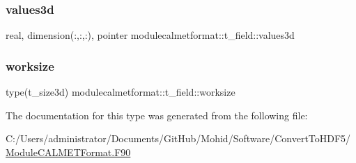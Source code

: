 \mbox{\label{structmodulecalmetformat_1_1t__field_a6c1fa6efd9f3f29ba20712a5677101bc}} 
\subsubsection{\texorpdfstring{values3d}{values3d}}
{\footnotesize\ttfamily real, dimension(\+:,\+:,\+:), pointer modulecalmetformat\+::t\+\_\+field\+::values3d\hspace{0.3cm}{\ttfamily [private]}}

\mbox{\label{structmodulecalmetformat_1_1t__field_ac818aee84fdb49936e4fc22bff1c706e}} 
\subsubsection{\texorpdfstring{worksize}{worksize}}
{\footnotesize\ttfamily type(t\+\_\+size3d) modulecalmetformat\+::t\+\_\+field\+::worksize\hspace{0.3cm}{\ttfamily [private]}}



The documentation for this type was generated from the following file\+:\begin{DoxyCompactItemize}
\item 
C\+:/\+Users/administrator/\+Documents/\+Git\+Hub/\+Mohid/\+Software/\+Convert\+To\+H\+D\+F5/\mbox{\hyperlink{_module_c_a_l_m_e_t_format_8_f90}{Module\+C\+A\+L\+M\+E\+T\+Format.\+F90}}\end{DoxyCompactItemize}
